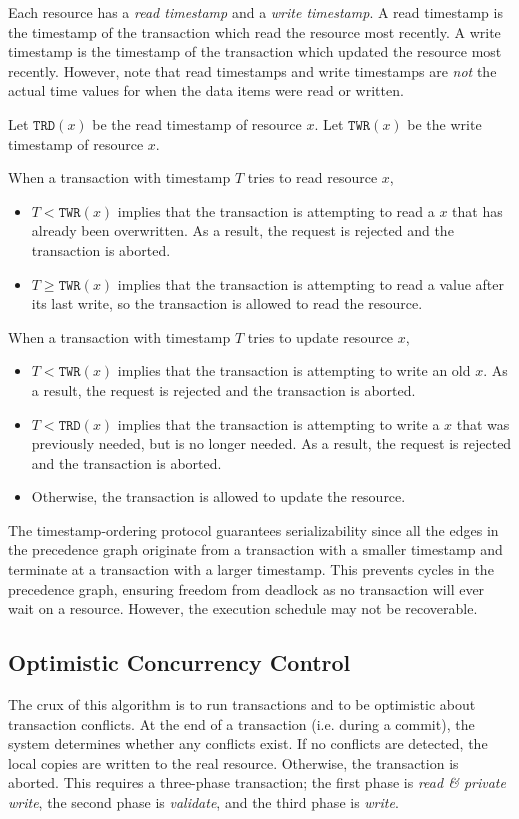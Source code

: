 Each resource has a \textit{read timestamp} and a \textit{write timestamp}. A read timestamp is the timestamp of the transaction which read the resource most recently. A write timestamp is the timestamp of the transaction which updated the resource most recently. However, note that read timestamps and write timestamps are \textit{not} the actual time values for when the data items were read or written.

Let $\mathtt{TRD}(x)$ be the read timestamp of resource $x$.  Let $\mathtt{TWR}(x)$ be the write timestamp of resource $x$. 

When a transaction with timestamp $T$ tries to read resource $x$, \begin{itemize}
\item $T < \mathtt{TWR}(x)$ implies that the transaction is attempting to read a $x$ that has already been overwritten. As a result, the request is rejected and the transaction is aborted.
\item $T \ge \mathtt{TWR}(x)$ implies that the transaction is attempting to read a value after its last write, so the transaction is allowed to read the resource. 
\end{itemize}

When a transaction with timestamp $T$ tries to update resource $x$, \begin{itemize}
\item $T < \mathtt{TWR}(x)$ implies that the transaction is attempting to write an old $x$. As a result, the request is rejected and the transaction is aborted.
\item $T < \mathtt{TRD}(x)$ implies that the transaction is attempting to write a $x$ that was previously needed, but is no longer needed. As a result, the request is rejected and the transaction is aborted.
\item Otherwise, the transaction is allowed to update the resource. 
\end{itemize}

The timestamp-ordering protocol guarantees serializability since all the edges in the precedence graph originate from a transaction with a smaller timestamp and terminate at a transaction with a larger timestamp. This prevents cycles in the precedence graph, ensuring freedom from deadlock as no transaction will ever wait on a resource. However, the execution schedule may not be recoverable.

\subsection{Optimistic Concurrency Control}
The crux of this algorithm is to run transactions and to be optimistic about transaction conflicts. At the end of a transaction (i.e. during a commit), the system determines whether any conflicts exist. If no conflicts are detected, the local copies are written to the real resource. Otherwise, the transaction is aborted. This requires a three-phase transaction; the first phase is \textit{read \& private write}, the second phase is \textit{validate}, and the third phase is \textit{write}.

